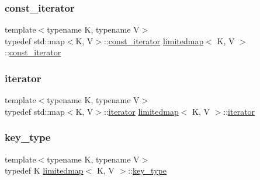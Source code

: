 \subsubsection{\texorpdfstring{const\+\_\+iterator}{const\_iterator}}
{\footnotesize\ttfamily template$<$typename K, typename V$>$ \\
typedef std\+::map$<$K, V$>$\+::\mbox{\hyperlink{classlimitedmap_ab0a3e4f2ec7c82359300c83a35ae2500}{const\+\_\+iterator}} \mbox{\hyperlink{classlimitedmap}{limitedmap}}$<$ K, V $>$\+::\mbox{\hyperlink{classlimitedmap_ab0a3e4f2ec7c82359300c83a35ae2500}{const\+\_\+iterator}}}

\mbox{\label{classlimitedmap_aea661213ab6f699e9667bea25bf99821}} 
\subsubsection{\texorpdfstring{iterator}{iterator}}
{\footnotesize\ttfamily template$<$typename K, typename V$>$ \\
typedef std\+::map$<$K, V$>$\+::\mbox{\hyperlink{classlimitedmap_aea661213ab6f699e9667bea25bf99821}{iterator}} \mbox{\hyperlink{classlimitedmap}{limitedmap}}$<$ K, V $>$\+::\mbox{\hyperlink{classlimitedmap_aea661213ab6f699e9667bea25bf99821}{iterator}}\hspace{0.3cm}{\ttfamily [protected]}}

\mbox{\label{classlimitedmap_aebf71255c65df699225cdcefe88717b9}} 
\subsubsection{\texorpdfstring{key\+\_\+type}{key\_type}}
{\footnotesize\ttfamily template$<$typename K, typename V$>$ \\
typedef K \mbox{\hyperlink{classlimitedmap}{limitedmap}}$<$ K, V $>$\+::\mbox{\hyperlink{classlimitedmap_aebf71255c65df699225cdcefe88717b9}{key\+\_\+type}}}

\mbox{\label{classlimitedmap_a8bd6b8e7f91f0a141c91c382b492c03c}} 
